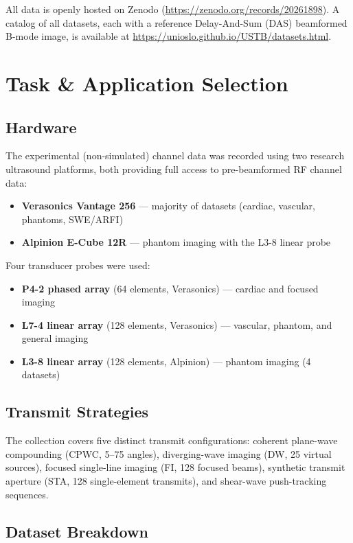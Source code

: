 \documentclass[11pt,a4paper]{article}
\begin{document}
\noindent All data is openly hosted on Zenodo (\url{https://zenodo.org/records/20261898}).
A catalog of all datasets, each with a reference Delay-And-Sum (DAS) beamformed B-mode image, is available at \url{https://unioslo.github.io/USTB/datasets.html}.

\section{Task \& Application Selection}

\subsection*{Hardware}
The experimental (non-simulated) channel data was recorded using two research ultrasound platforms, both providing full access to pre-beamformed RF channel data:
\begin{itemize}[nosep]
  \item \textbf{Verasonics Vantage 256} --- majority of datasets (cardiac, vascular, phantoms, SWE/ARFI)
  \item \textbf{Alpinion E-Cube 12R} --- phantom imaging with the L3-8 linear probe
\end{itemize}
\noindent Four transducer probes were used:
\begin{itemize}[nosep]
  \item \textbf{P4-2 phased array} (64 elements, Verasonics) --- cardiac and focused imaging
  \item \textbf{L7-4 linear array} (128 elements, Verasonics) --- vascular, phantom, and general imaging
  \item \textbf{L3-8 linear array} (128 elements, Alpinion) --- phantom imaging (4 datasets)
\end{itemize}

\subsection*{Transmit Strategies}
The collection covers five distinct transmit configurations:
coherent plane-wave compounding (CPWC, 5--75 angles),
diverging-wave imaging (DW, 25 virtual sources),
focused single-line imaging (FI, 128 focused beams),
synthetic transmit aperture (STA, 128 single-element transmits),
and shear-wave push-tracking sequences.

\subsection*{Dataset Breakdown}
\end{document}

